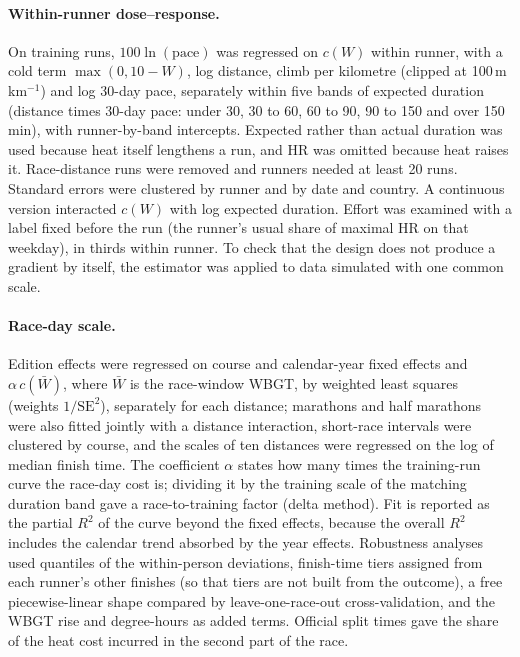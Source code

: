 \documentclass[12pt]{article}
\newcommand{\cW}{$c(W)$}
\begin{document}
\paragraph{Within-runner dose--response.} On training runs, $100 \ln(\text{pace})$ was regressed on \cW{} within runner, with a cold term $\max(0, 10 - W)$, log distance, climb per kilometre (clipped at 100\,m\,km$^{-1}$) and log 30-day pace, separately within five bands of expected duration (distance times 30-day pace: under 30, 30 to 60, 60 to 90, 90 to 150 and over 150\,min), with runner-by-band intercepts. Expected rather than actual duration was used because heat itself lengthens a run, and HR was omitted because heat raises it. Race-distance runs were removed and runners needed at least 20 runs. Standard errors were clustered by runner and by date and country. A continuous version interacted \cW{} with log expected duration. Effort was examined with a label fixed before the run (the runner's usual share of maximal HR on that weekday), in thirds within runner. To check that the design does not produce a gradient by itself, the estimator was applied to data simulated with one common scale.

\paragraph{Race-day scale.} Edition effects were regressed on course and calendar-year fixed effects and $\alpha\,c(\bar W)$, where $\bar W$ is the race-window WBGT, by weighted least squares (weights $1/\mathrm{SE}^2$), separately for each distance; marathons and half marathons were also fitted jointly with a distance interaction, short-race intervals were clustered by course, and the scales of ten distances were regressed on the log of median finish time. The coefficient $\alpha$ states how many times the training-run curve the race-day cost is; dividing it by the training scale of the matching duration band gave a race-to-training factor (delta method). Fit is reported as the partial $R^2$ of the curve beyond the fixed effects, because the overall $R^2$ includes the calendar trend absorbed by the year effects. Robustness analyses used quantiles of the within-person deviations, finish-time tiers assigned from each runner's other finishes (so that tiers are not built from the outcome), a free piecewise-linear shape compared by leave-one-race-out cross-validation, and the WBGT rise and degree-hours as added terms. Official split times gave the share of the heat cost incurred in the second part of the race.
\end{document}
